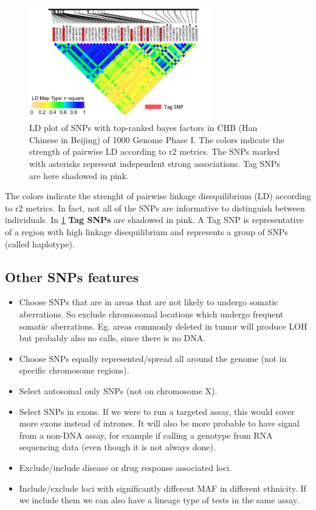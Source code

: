\begin{figure}
	\centering
	\includegraphics[width=0.7\textwidth]{linkage.png}
	\caption{\label{fig:linkage}LD plot of SNPs with top-ranked bayes factors in CHB (Han Chinese in Beijing) of 1000 Genome Phase I. The colors indicate the
strength of pairwise LD according to r2 metrics. The SNPs marked with asterisks represent independent strong associations. Tag SNPs are here shadowed in pink.}
\end{figure}

The colors indicate the strenght of pairwise linkage disequilibrium (LD) according to r2 metrics. In fact, not all of the SNPs are informative to distinguish between individuals. 
In \ref{fig:linkage} \textbf{Tag SNPs} are shadowed in pink. A Tag SNP is representative of a region with high linkage disequilibrium and represents a group of SNPs (called haplotype).


\subsection{Other SNPs features} 
\begin{itemize}
	\item Choose SNPs that are in areas that are not likely to undergo somatic aberrations. So exclude chromosomal locations which undergo frequent somatic aberrations. Eg. areas commonly deleted in tumor will produce LOH but probably also no calls, since there is no DNA. 
	\item Choose SNPs equally represented/spread all around the genome (not in specific chromosome regions).
	\item Select autosomal only SNPs (not on chromosome X).
	\item Select SNPs in exons. If we were to run a targeted assay, this would cover more exons instead of intrones. It will also be more probable to have signal from a non-DNA assay, for example if calling a genotype from RNA sequencing data (even though it is not always done).
	\item Exclude/include disease or drug response associated loci. 
	\item Include/exclude loci with significantly different MAF in different ethnicity. If we include them we can also have a lineage type of tests in the same assay. 
\end{itemize}


